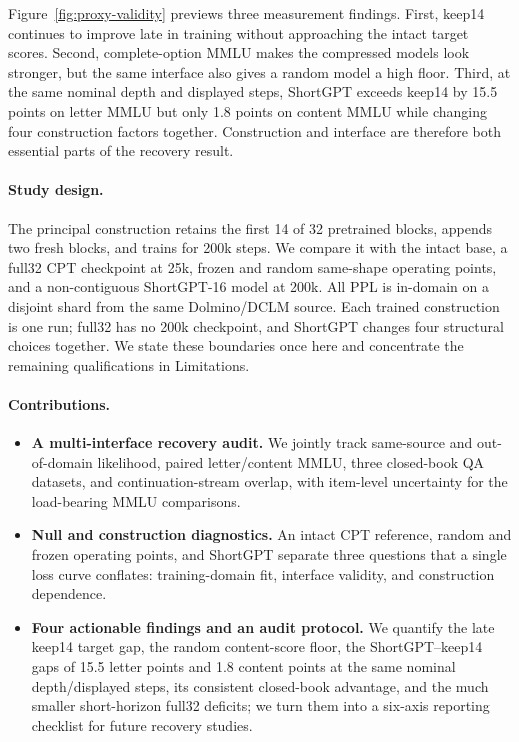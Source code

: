 Figure~\ref{fig:proxy-validity} previews three measurement findings. First,
keep14 continues to improve late in training without approaching the intact
target scores. Second, complete-option MMLU makes the compressed models look
stronger, but the same interface also gives a random model a high floor. Third,
at the same nominal depth and displayed steps, ShortGPT exceeds keep14 by
15.5 points on letter MMLU but only 1.8 points on content MMLU while changing
four construction factors together. Construction and interface are therefore
both essential parts of the recovery result.

\paragraph{Study design.}
The principal construction retains the first 14 of 32 pretrained blocks,
appends two fresh blocks, and trains for 200k steps. We compare it with the
intact base, a full32 CPT checkpoint at 25k, frozen and random same-shape
operating points, and a non-contiguous ShortGPT-16 model at 200k. All PPL is
in-domain on a disjoint shard from the same Dolmino/DCLM source. Each trained
construction is one run; full32 has no 200k checkpoint, and ShortGPT changes
four structural choices together. We state these boundaries once here and
concentrate the remaining qualifications in Limitations.

\paragraph{Contributions.}
\begin{itemize}[leftmargin=1.2em,itemsep=2pt]
\item \textbf{A multi-interface recovery audit.} We jointly track same-source
and out-of-domain likelihood, paired letter/content MMLU, three closed-book QA
datasets, and continuation-stream overlap, with item-level uncertainty for the
load-bearing MMLU comparisons.
\item \textbf{Null and construction diagnostics.} An intact CPT reference,
random and frozen operating points, and ShortGPT separate three questions that
a single loss curve conflates: training-domain fit, interface validity, and
construction dependence.
\item \textbf{Four actionable findings and an audit protocol.} We quantify the
late keep14 target gap, the random content-score floor, the
ShortGPT--keep14 gaps of 15.5 letter points and 1.8 content points at the same
nominal depth/displayed steps, its consistent closed-book advantage, and the
much smaller short-horizon full32 deficits;
we turn them into a six-axis reporting checklist for future recovery studies.
\end{itemize}
